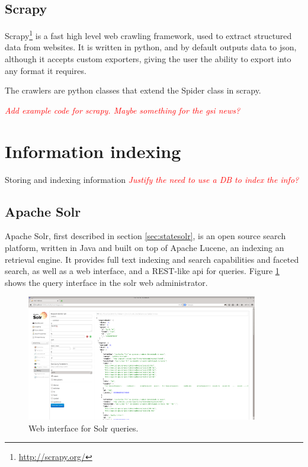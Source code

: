 \subsection{Scrapy}

Scrapy\footnote{\url{http://scrapy.org/}} is a fast high level web crawling framework, used to extract structured data from websites. It is written in python, and by default outputs data to json, although it accepts custom exporters, giving the user the ability to export into any format it requires.

The crawlers are python classes that extend the Spider class in scrapy.

\emph{\textcolor{red}{Add example code for scrapy. Maybe something for the gsi news?}}

\section{Information indexing}

Storing and indexing information \emph{\textcolor{red}{Justify the need to use a DB to index the info?}}

\subsection{Apache Solr}

Apache Solr, first described in section \ref{sec:statesolr}, is an open source search platform, written in Java and built on top of Apache Lucene, an indexing an retrieval engine. It provides full text indexing and search capabilities and faceted search, as well as a web interface, and a REST-like api for queries. Figure \ref{fig:solr1} shows the query interface in the solr web administrator.

\begin{figure}[!htbp]
    \centering
    \includegraphics[width=0.9\textwidth]{img/screens/solr-interface.png}
    \caption{Web interface for Solr queries.}
    \label{fig:solr1}
\end{figure}

